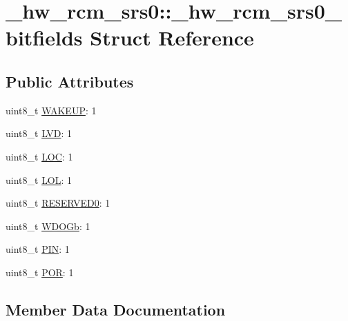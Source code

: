 \hypertarget{struct__hw__rcm__srs0_1_1__hw__rcm__srs0__bitfields}{}\section{\+\_\+hw\+\_\+rcm\+\_\+srs0\+:\+:\+\_\+hw\+\_\+rcm\+\_\+srs0\+\_\+bitfields Struct Reference}
\label{struct__hw__rcm__srs0_1_1__hw__rcm__srs0__bitfields}
\subsection*{Public Attributes}
\begin{DoxyCompactItemize}
\item 
uint8\+\_\+t \hyperlink{struct__hw__rcm__srs0_1_1__hw__rcm__srs0__bitfields_a860e9b1835621cc57906535ba4a90b5d}{W\+A\+K\+E\+UP}\+: 1
\item 
uint8\+\_\+t \hyperlink{struct__hw__rcm__srs0_1_1__hw__rcm__srs0__bitfields_a24ca7da18981955d878a6dbd2bf0c001}{L\+VD}\+: 1
\item 
uint8\+\_\+t \hyperlink{struct__hw__rcm__srs0_1_1__hw__rcm__srs0__bitfields_a0055ee6f5c77803403b21bb54408196c}{L\+OC}\+: 1
\item 
uint8\+\_\+t \hyperlink{struct__hw__rcm__srs0_1_1__hw__rcm__srs0__bitfields_ab3a3c04214ede4e79a45116dbac63818}{L\+OL}\+: 1
\item 
uint8\+\_\+t \hyperlink{struct__hw__rcm__srs0_1_1__hw__rcm__srs0__bitfields_a1151fbe5d3fd59459af29111bd9e1a36}{R\+E\+S\+E\+R\+V\+E\+D0}\+: 1
\item 
uint8\+\_\+t \hyperlink{struct__hw__rcm__srs0_1_1__hw__rcm__srs0__bitfields_ae941e40f1f18a62db47d62112196d8e6}{W\+D\+O\+Gb}\+: 1
\item 
uint8\+\_\+t \hyperlink{struct__hw__rcm__srs0_1_1__hw__rcm__srs0__bitfields_a5af5da4bdc3d786ebcf4f1c0541d34ce}{P\+IN}\+: 1
\item 
uint8\+\_\+t \hyperlink{struct__hw__rcm__srs0_1_1__hw__rcm__srs0__bitfields_a98952b0a57d4048e3d2522b1313f64b9}{P\+OR}\+: 1
\end{DoxyCompactItemize}


\subsection{Member Data Documentation}
